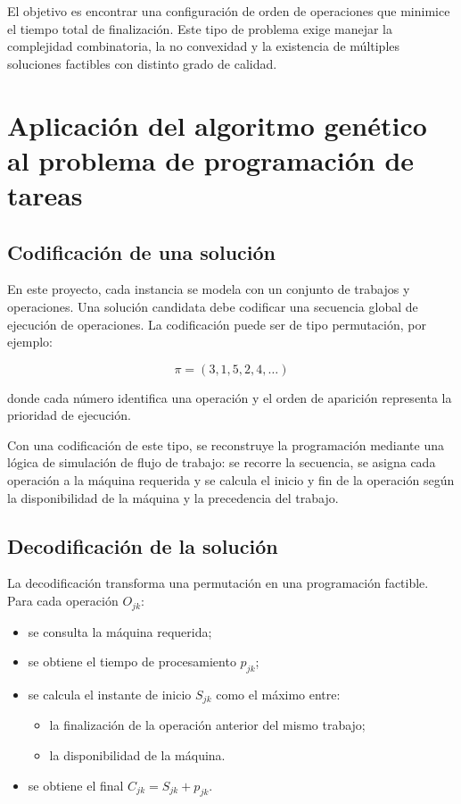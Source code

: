 \documentclass[11pt,a4paper]{article}
\begin{document}
El objetivo es encontrar una configuración de orden de operaciones que minimice el tiempo total de finalización. Este tipo de problema exige manejar la complejidad combinatoria, la no convexidad y la existencia de múltiples soluciones factibles con distinto grado de calidad.

\section{Aplicación del algoritmo genético al problema de programación de tareas}

\subsection{Codificación de una solución}

En este proyecto, cada instancia se modela con un conjunto de trabajos y operaciones. Una solución candidata debe codificar una secuencia global de ejecución de operaciones. La codificación puede ser de tipo permutación, por ejemplo:

$$
\pi = (3,1,5,2,4,\dots)
$$

donde cada número identifica una operación y el orden de aparición representa la prioridad de ejecución.

Con una codificación de este tipo, se reconstruye la programación mediante una lógica de simulación de flujo de trabajo: se recorre la secuencia, se asigna cada operación a la máquina requerida y se calcula el inicio y fin de la operación según la disponibilidad de la máquina y la precedencia del trabajo.

\subsection{Decodificación de la solución}

La decodificación transforma una permutación en una programación factible. Para cada operación $O_{jk}$:

\begin{itemize}
    \item se consulta la máquina requerida;
    \item se obtiene el tiempo de procesamiento $p_{jk}$;
    \item se calcula el instante de inicio $S_{jk}$ como el máximo entre:
    \begin{itemize}
        \item la finalización de la operación anterior del mismo trabajo;
        \item la disponibilidad de la máquina.
    \end{itemize}
    \item se obtiene el final $C_{jk} = S_{jk} + p_{jk}$.
\end{itemize}
\end{document}
